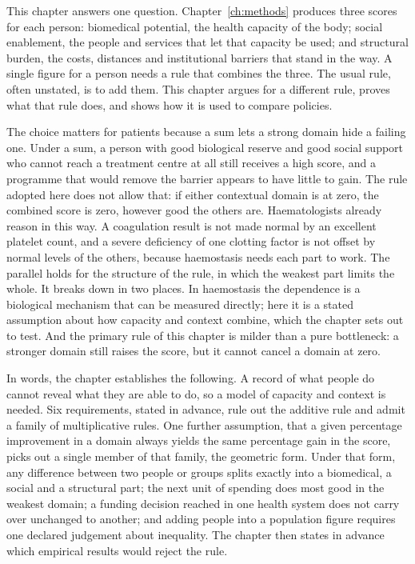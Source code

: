 
\label{app:crf}

This chapter answers one question. Chapter~\ref{ch:methods} produces three
scores for each person: biomedical potential, the health capacity of the body;
social enablement, the people and services that let that capacity be used; and
structural burden, the costs, distances and institutional barriers that stand
in the way. A single figure for a person needs a rule that combines the three.
The usual rule, often unstated, is to add them. This chapter argues for a
different rule, proves what that rule does, and shows how it is used to compare
policies.

The choice matters for patients because a sum lets a strong domain hide a
failing one. Under a sum, a person with good biological reserve and good
social support who cannot reach a treatment centre at all still receives a
high score, and a programme that would remove the barrier appears to have
little to gain. The rule adopted here does not allow that: if either contextual
domain is at zero, the combined score is zero, however good the others are.
Haematologists already reason in this way. A coagulation result is not made
normal by an excellent platelet count, and a severe deficiency of one clotting
factor is not offset by normal levels of the others, because haemostasis needs
each part to work. The parallel holds for the structure of the rule, in which
the weakest part limits the whole. It breaks down in two places. In haemostasis
the dependence is a biological mechanism that can be measured directly; here it
is a stated assumption about how capacity and context combine, which the
chapter sets out to test. And the primary rule of this chapter is milder than a
pure bottleneck: a stronger domain still raises the score, but it cannot cancel
a domain at zero.

In words, the chapter establishes the following. A record of what people do
cannot reveal what they are able to do, so a model of capacity and context is
needed. Six requirements, stated in advance, rule out the additive rule and
admit a family of multiplicative rules. One further assumption, that a given
percentage improvement in a domain always yields the same percentage gain in
the score, picks out a single member of that family, the geometric form. Under
that form, any difference between two people or groups splits exactly into a
biomedical, a social and a structural part; the next unit of spending does most
good in the weakest domain; a funding decision reached in one health system
does not carry over unchanged to another; and adding people into a population
figure requires one declared judgement about inequality. The chapter then
states in advance which empirical results would reject the rule.

